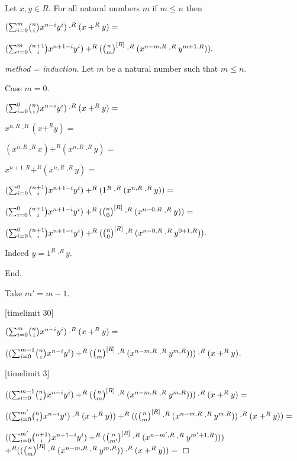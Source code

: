 \documentclass[english,11pt]{article}
\begin{document}
\begin{forthel}

\begin{lemma}
Let $x,y \in R$. For all natural numbers $m$ if $m \leq n$ then

$(\binsum{m}{n}{x}{y}{R}) \cdot^{R} (x +^{R} y) =$

$(\binsum{m}{n+1}{x}{y}{R}) +^{R} 
(\cho{n}{m}^{[R]} \cdot^{R} (x^{n-m,R} \cdot^{R} y^{m+1,R})).$
\end{lemma}

\begin{proof}[method = induction]
Let $m$ be a natural number such that $m \leq n$.

Case $m = 0$. 

$(\binsum{0}{n}{x}{y}{R}) \cdot^{R} (x +^{R} y) =$

$x^{n,R} \cdot^{R} (x +^{R} y) =$

$(x^{n,R} \cdot^{R} x) +^{R} (x^{n,R} \cdot^{R} y) =$

$x^{n+1,R} +^{R} (x^{n,R} \cdot^{R} y) =$

$(\binsum{0}{n+1}{x}{y}{R}) +^{R} (1^{R} \cdot^{R}(x^{n,R} \cdot^{R} y)) =$

$(\binsum{0}{n+1}{x}{y}{R}) +^{R} (\cho{n}{0}^{[R]} \cdot^{R}(x^{n-0,R} \cdot^{R} y)) =$

$(\binsum{0}{n+1}{x}{y}{R}) +^{R} (\cho{n}{0}^{[R]} \cdot^{R}(x^{n-0,R} \cdot^{R} y^{0+1,R}))$.

Indeed $y = 1^{R} \cdot^{R} y$.

End.

Take $m' = m-1$.

[timelimit 30]

$(\binsum{m}{n}{x}{y}{R}) \cdot^{R} (x +^{R} y) = $

$((\binsum{m-1}{n}{x}{y}{R}) +^{R} 
(\cho{n}{m}^{[R]} \cdot^{R} (x^{n - m,R} \cdot^{R} y^{m,R}))) \cdot^{R} (x +^{R} y)$.

[timelimit 3]

$((\binsum{m-1}{n}{x}{y}{R}) +^{R} 
(\cho{n}{m}^{[R]} \cdot^{R} (x^{n - m,R} \cdot^{R} y^{m,R}))) \cdot^{R} (x +^{R} y) =$

$ ((\binsum{m'}{n}{x}{y}{R}) \cdot^{R} (x +^{R} y)) +^{R} 
((\cho{n}{m}^{[R]} \cdot^{R} (x^{n - m,R} \cdot^{R} y^{m,R})) \cdot^{R} (x +^{R} y)) =$

$ ((\binsum{m'}{n+1}{x}{y}{R}) +^{R} (\cho{n}{m'}^{[R]} \cdot^{R} (x^{n-m',R} \cdot^{R} y^{m'+1,R}))) $
$ +^{R} ((\cho{n}{m}^{[R]} \cdot^{R} (x^{n - m,R} \cdot^{R} y^{m,R})) \cdot^{R} (x +^{R} y)) =$


\end{proof}
\end{forthel}
\end{document}
